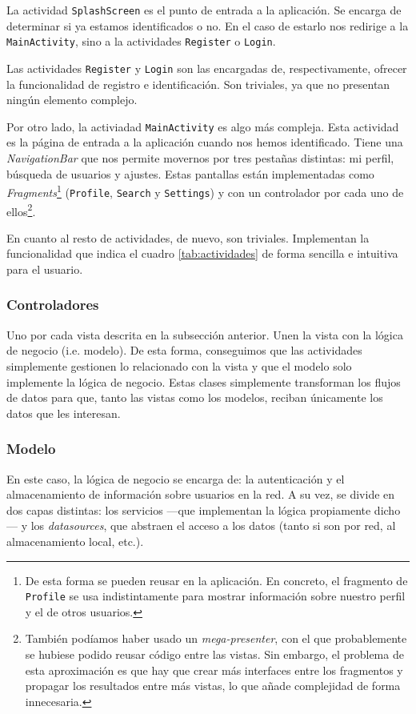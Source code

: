 \documentclass[a4paper,12pt]{article}
\begin{document}
La actividad \texttt{SplashScreen} es el punto de entrada a la aplicación. Se encarga de determinar si ya estamos identificados o no. En el caso de estarlo nos redirige a la \texttt{MainActivity}, sino a la actividades \texttt{Register} o \texttt{Login}.

Las actividades \texttt{Register} y \texttt{Login} son las encargadas de, respectivamente, ofrecer la funcionalidad de registro e identificación. Son triviales, ya que no presentan ningún elemento complejo.

Por otro lado, la activiadad \texttt{MainActivity} es algo más compleja. Esta actividad es la página de entrada a la aplicación cuando nos hemos identificado. Tiene una \textit{NavigationBar} que nos permite movernos por tres pestañas distintas: mi perfil, búsqueda de usuarios y ajustes. Estas pantallas están implementadas como \textit{Fragments}\footnote{De esta forma se pueden reusar en la aplicación. En concreto, el fragmento de \texttt{Profile} se usa indistintamente para mostrar información sobre nuestro perfil y el de otros usuarios.} (\texttt{Profile}, \texttt{Search} y \texttt{Settings}) y con un controlador por cada uno de ellos\footnote{También podíamos haber usado un \textit{mega-presenter}, con el que probablemente se hubiese podido reusar código entre las vistas. Sin embargo, el problema de esta aproximación es que hay que crear más interfaces entre los fragmentos y propagar los resultados entre más vistas, lo que añade complejidad de forma innecesaria.}.

En cuanto al resto de actividades, de nuevo, son triviales. Implementan la funcionalidad que indica el cuadro \ref{tab:actividades} de forma sencilla e intuitiva para el usuario.
\subsubsection{Controladores}
Uno por cada vista descrita en la subsección anterior. Unen la vista con la lógica de negocio (i.e. modelo). De esta forma, conseguimos que las actividades simplemente gestionen lo relacionado con la vista y que el modelo solo implemente la lógica de negocio. Estas clases simplemente transforman los flujos de datos para que, tanto las vistas como los modelos, reciban únicamente los datos que les interesan.
\subsubsection{Modelo}
En este caso, la lógica de negocio se encarga de: la autenticación y el almacenamiento de información sobre usuarios en la red. A su vez, se divide en dos capas distintas: los servicios ---que implementan la lógica propiamente dicho--- y los \textit{datasources}, que abstraen el acceso a los datos (tanto si son por red, al almacenamiento local, etc.).
\end{document}
